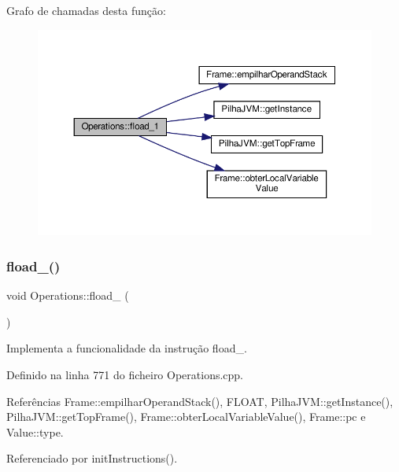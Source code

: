 Grafo de chamadas desta função\+:
\nopagebreak
\begin{figure}[H]
\begin{center}
\leavevmode
\includegraphics[width=350pt]{classOperations_a71611bd9fa43e8e170a35f3a5e1f0572_cgraph}
\end{center}
\end{figure}
\mbox{\label{classOperations_a1d1767084d543ab73c8417efe11e195e}} 
\subsubsection{\texorpdfstring{fload\+\_()}{fload\_2()}}
{\footnotesize\ttfamily void Operations\+::fload\+\_ (\begin{DoxyParamCaption}{ }\end{DoxyParamCaption})\hspace{0.3cm}{\ttfamily [private]}}



Implementa a funcionalidade da instrução fload\+\_. 



Definido na linha 771 do ficheiro Operations.\+cpp.



Referências Frame\+::empilhar\+Operand\+Stack(), F\+L\+O\+AT, Pilha\+J\+V\+M\+::get\+Instance(), Pilha\+J\+V\+M\+::get\+Top\+Frame(), Frame\+::obter\+Local\+Variable\+Value(), Frame\+::pc e Value\+::type.



Referenciado por init\+Instructions().

